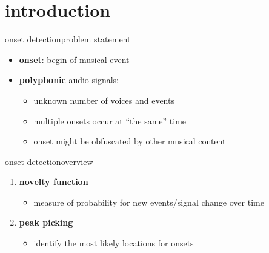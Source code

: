     \section[intro]{introduction}
        \begin{frame}{onset detection}{problem statement}
            \begin{itemize}
                \item \textbf{onset}: begin of musical event

                \bigskip
                \item   \textbf{polyphonic} audio signals:
                    \begin{itemize}
                        \item   unknown number of voices and events
                        \item   multiple onsets occur at ``the same'' time
                        \item   onset might be obfuscated by other musical content
                    \end{itemize}
            \end{itemize}
        \end{frame}

        \begin{frame}{onset detection}{overview}
            \begin{figure}
                \centering
                
            \end{figure}
            
            \begin{enumerate}
                \item<2-> 	\textbf{novelty function}
                    \begin{itemize}
                        \item	measure of probability for new events/signal change over time	
                    \end{itemize}
                
                \bigskip
                \item<3->	\textbf{peak picking}
                    \begin{itemize}
                        \item	identify the most likely locations for onsets
                    \end{itemize}
            \end{enumerate}
        \end{frame}
        
